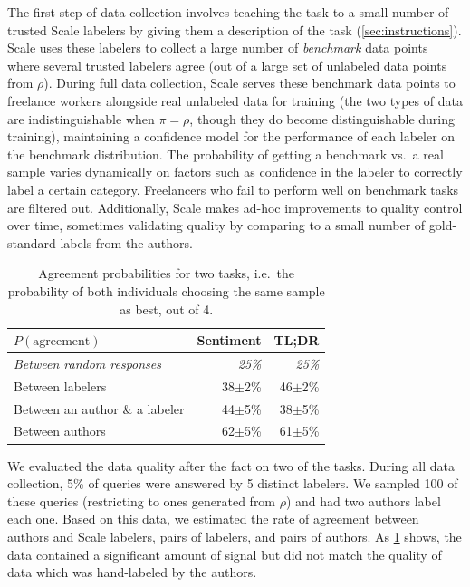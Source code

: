 \documentclass{article}
\begin{document}
The first step of data collection involves teaching the task to a small number of trusted Scale labelers by giving them a description of the task (\cref{sec:instructions}).  Scale uses these labelers to collect a large number of \emph{benchmark} data points where several trusted labelers agree (out of a large set of unlabeled data points from $\rho$).  During full data collection, Scale serves these benchmark data points to freelance workers alongside real unlabeled data for training (the two types of data are indistinguishable when $\pi = \rho$, though they do become distinguishable during training), maintaining a confidence model for the performance of each labeler on the benchmark distribution.  The probability of getting a benchmark vs.\ a real sample varies dynamically on factors such as confidence in the labeler to correctly label a certain category.  Freelancers who fail to perform well on benchmark tasks are filtered out.  Additionally, Scale makes ad-hoc improvements to quality control over time, sometimes validating quality by comparing to a small number of gold-standard labels from the authors.

\begin{table}[t]
\begin{tabular}{l|r|r}
\hline
$P(\mathrm{agreement})$        & \multicolumn{1}{l|}{Sentiment}  & \multicolumn{1}{l}{TL;DR} \\
\hline
\textit{Between random responses} & \textit{25\%\phantom{$\pm$0}} & \textit{25\%\phantom{$\pm$0}} \\
Between labelers               & 38$\pm$2\% & 46$\pm$2\% \\     
Between an author \& a labeler & 44$\pm$5\% & 38$\pm$5\% \\
Between authors                & 62$\pm$5\% & 61$\pm$5\% \\
\hline
\end{tabular}
\caption{Agreement probabilities for two tasks, i.e.\ the probability of both individuals choosing the same sample as best, out of 4.}\label{tab:agreement}
\end{table}

We evaluated the data quality after the fact on two of the tasks.  During all data collection, 5\% of queries were answered by 5 distinct labelers.  We sampled 100 of these queries (restricting to ones generated from $\rho$) and had two authors label each one.  Based on this data, we estimated the rate of agreement between authors and Scale labelers, pairs of labelers, and pairs of authors.  As \cref{tab:agreement} shows, the data contained a significant amount of signal but did not match the quality of data which was hand-labeled by the authors.  
\end{document}
